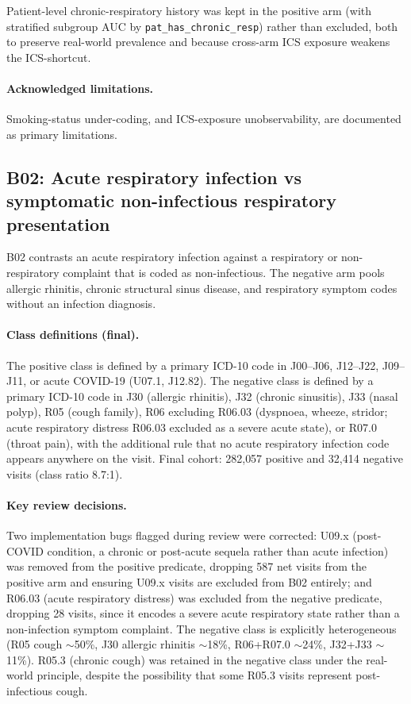 \documentclass[utf8]{frontiers_suppmat} %
\begin{document}
Patient-level chronic-respiratory history was kept in the positive
arm (with stratified subgroup AUC by \texttt{pat\_has\_chronic\_resp})
rather than excluded, both to preserve real-world prevalence and
because cross-arm ICS exposure weakens the ICS-shortcut.

\paragraph{Acknowledged limitations.} Smoking-status under-coding,
and ICS-exposure unobservability, are documented as primary
limitations.

\subsection{B02: Acute respiratory infection vs symptomatic non-infectious respiratory presentation}
\label{sec:supp-b02}

B02 contrasts an acute respiratory infection against a respiratory
or non-respiratory complaint that is coded as non-infectious. The
negative arm pools allergic rhinitis, chronic structural sinus disease,
and respiratory symptom codes without an infection diagnosis.

\paragraph{Class definitions (final).} The positive class is defined
by a primary ICD-10 code in J00--J06, J12--J22, J09--J11, or acute
COVID-19 (U07.1, J12.82). The negative class is defined by
a primary ICD-10 code in J30 (allergic rhinitis), J32 (chronic
sinusitis), J33 (nasal polyp), R05 (cough family), R06 excluding
R06.03 (dyspnoea, wheeze, stridor; acute respiratory distress R06.03
excluded as a severe acute state), or R07.0 (throat pain), with the
additional rule that no acute respiratory infection code appears
anywhere on the visit. Final cohort: 282{,}057 positive and 32{,}414
negative visits (class ratio 8.7:1).

\paragraph{Key review decisions.} Two implementation bugs flagged
during review were corrected: U09.x (post-COVID condition, a chronic
or post-acute sequela rather than acute infection) was removed from
the positive predicate, dropping 587 net visits from the positive arm
and ensuring U09.x visits are excluded from B02 entirely; and R06.03
(acute respiratory distress) was excluded from the negative predicate,
dropping 28 visits, since it encodes a severe acute respiratory state
rather than a non-infection symptom complaint. The negative class is
explicitly heterogeneous (R05 cough $\sim$50\%, J30 allergic rhinitis
$\sim$18\%, R06+R07.0 $\sim$24\%, J32+J33 $\sim$11\%). R05.3 (chronic
cough) was retained in the negative class under the real-world
principle, despite the possibility that some R05.3 visits represent
post-infectious cough.
\end{document}
